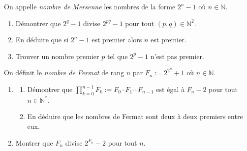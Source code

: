 \begin{exo}
	On appelle \emph{nombre de Mersenne} les nombres de la forme $2^n - 1$ o\`u $n \in \mathbb{N}$.
	\begin{enumerate}
		\item D\'emontrer que $2^q - 1$ divise $2^{pq} - 1$ pour tout $(p,q) \in \mathbb{N}^2$.
		\item En d\'eduire que si $2^n - 1$ est premier alors $n$ est premier.
		\item Trouver un nombre premier $p$ tel que $2^p - 1$ n'est pas premier.
	\end{enumerate}
\end{exo}
%
\begin{exo}
	On d\'efinit le \emph{nombre de Fermat} de rang $n$ par $F_n := 2^{2^n} + 1$ o\`u $n \in \mathbb{N}$.
	\begin{enumerate}
		\item
			\begin{enumerate}
				\item D\'emontrer que $\prod_{k = 0}^{n -1} F_k := F_0 \cdot F_1 \cdots F_{n-1}$ 
					est \'egal \`a $F_n - 2$ pour tout $n\in\mathbb{N}^*$.
				\item En d\'eduire que les nombres de Fermat sont deux \`a deux premiers entre eux.
			\end{enumerate}
		\item Montrer que $F_n$ divise $2^{F_n} - 2$ pour tout $n$.
	\end{enumerate}
%	
\end{exo}

